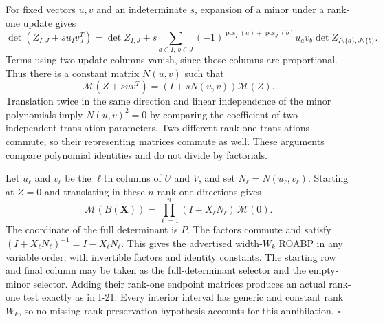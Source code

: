 \documentclass[11pt,a4paper]{article}
\theoremstyle{definition}\newtheorem{definition}{Definition}
\begin{document}
For fixed vectors $u,v$ and an indeterminate $s$, expansion
of a minor under a rank-one update gives
\[
 \det(Z_{I,J}+s u_Iv_J^T)
 =\det Z_{I,J}
  +s\sum_{a\in I,\ b\in J}
        (-1)^{\operatorname{pos}_I(a)+\operatorname{pos}_J(b)}
        u_av_b\det Z_{I\setminus\{a\},J\setminus\{b\}}.
\]
Terms using two update columns vanish, since those columns are
proportional.  Thus there is a constant matrix $N(u,v)$ such that
\[
 \mathcal M(Z+suv^T)=(I+sN(u,v))\mathcal M(Z).
\]
Translation twice in the same direction and linear independence
of the minor polynomials imply $N(u,v)^2=0$ by comparing the
coefficient of two independent translation parameters.  Two
different rank-one translations commute, so their representing
matrices commute as well.  These arguments compare polynomial
identities and do not divide by factorials.

Let $u_\ell$ and $v_\ell$ be the $\ell$th columns of $U$ and
$V$, and set $N_\ell=N(u_\ell,v_\ell)$.  Starting at $Z=0$
and translating in these $n$ rank-one directions gives
\[
 \mathcal M(B(\mathbf X))
     =\prod_{\ell=1}^n(I+X_\ell N_\ell)\,\mathcal M(0).
\]
The coordinate of the full determinant is $P$.  The factors
commute and satisfy
$(I+X_\ell N_\ell)^{-1}=I-X_\ell N_\ell$.
This gives the advertised width-$W_k$ ROABP in any variable
order, with invertible factors and identity constants.
The starting row and final column may be taken as the
full-determinant selector and the empty-minor selector.
Adding their rank-one endpoint matrices produces an actual
rank-one test exactly as in I-21.  Every interior interval
has generic and constant rank $W_k$, so no missing rank
preservation hypothesis accounts for this annihilation.
\hfill$\square$
\end{document}
